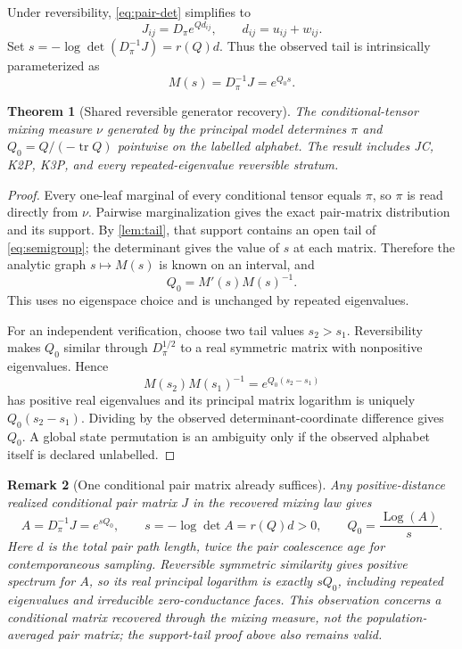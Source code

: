 \documentclass[11pt]{article}
\newtheorem{theorem}{Theorem}[section]
\newtheorem{remark}[theorem]{Remark}
\newcommand{\tr}{\operatorname{tr}}
\begin{document}
Under reversibility, \eqref{eq:pair-det} simplifies to
\begin{equation}
J_{ij}=D_\pi e^{Qd_{ij}},\qquad d_{ij}=u_{ij}+w_{ij}.
\label{eq:revpair}
\end{equation}
Set $s=-\log\det(D_\pi^{-1}J)=r(Q)d$.  Thus the observed tail is intrinsically parameterized as
\begin{equation}
M(s)=D_\pi^{-1}J=e^{Q_0s}.
\label{eq:semigroup}
\end{equation}

\begin{theorem}[Shared reversible generator recovery]
\label{thm:generator}
The conditional-tensor mixing measure $\nu$ generated by the principal model determines $\pi$ and $Q_0=Q/(-\tr Q)$ pointwise on the labelled alphabet.  The result includes JC, K2P, K3P, and every repeated-eigenvalue reversible stratum.
\end{theorem}

\begin{proof}
Every one-leaf marginal of every conditional tensor equals $\pi$, so $\pi$ is read directly from $\nu$.  Pairwise marginalization gives the exact pair-matrix distribution and its support.  By \cref{lem:tail}, that support contains an open tail of \eqref{eq:semigroup}; the determinant gives the value of $s$ at each matrix.  Therefore the analytic graph $s\mapsto M(s)$ is known on an interval, and
\[
Q_0=M'(s)M(s)^{-1}.
\]
This uses no eigenspace choice and is unchanged by repeated eigenvalues.

For an independent verification, choose two tail values $s_2>s_1$.  Reversibility makes $Q_0$ similar through $D_\pi^{1/2}$ to a real symmetric matrix with nonpositive eigenvalues.  Hence
\[
M(s_2)M(s_1)^{-1}=e^{Q_0(s_2-s_1)}
\]
has positive real eigenvalues and its principal matrix logarithm is uniquely $Q_0(s_2-s_1)$.  Dividing by the observed determinant-coordinate difference gives $Q_0$.  A global state permutation is an ambiguity only if the observed alphabet itself is declared unlabelled.
\end{proof}

\begin{remark}[One conditional pair matrix already suffices]
Any positive-distance \emph{realized conditional} pair matrix $J$ in the recovered mixing law gives
\[
A=D_\pi^{-1}J=e^{sQ_0},\qquad
s=-\log\det A=r(Q)d>0,\qquad
Q_0=\frac{\operatorname{Log}(A)}{s}.
\]
Here $d$ is the total pair path length, twice the pair coalescence age for contemporaneous sampling.  Reversible symmetric similarity gives positive spectrum for $A$, so its real principal logarithm is exactly $sQ_0$, including repeated eigenvalues and irreducible zero-conductance faces.  This observation concerns a conditional matrix recovered through the mixing measure, not the population-averaged pair matrix; the support-tail proof above also remains valid.
\end{remark}
\end{document}
